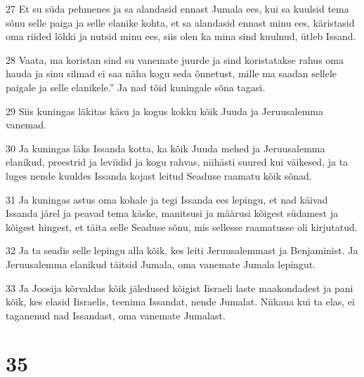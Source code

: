 \par 27 Et su süda pehmenes ja sa alandasid ennast Jumala ees, kui sa kuulsid tema sõnu selle paiga ja selle elanike kohta, et sa alandasid ennast minu ees, käristasid oma riided lõhki ja nutsid minu ees, siis olen ka mina sind kuulnud, ütleb Issand.
\par 28 Vaata, ma koristan sind su vanemate juurde ja sind koristatakse rahus oma hauda ja sinu silmad ei saa näha kogu seda õnnetust, mille ma saadan sellele paigale ja selle elanikele.” Ja nad tõid kuningale sõna tagasi.
\par 29 Siis kuningas läkitas käsu ja kogus kokku kõik Juuda ja Jeruusalemma vanemad.
\par 30 Ja kuningas läks Issanda kotta, ka kõik Juuda mehed ja Jeruusalemma elanikud, preestrid ja leviidid ja kogu rahvas, niihästi suured kui väikesed, ja ta luges nende kuuldes Issanda kojast leitud Seaduse raamatu kõik sõnad.
\par 31 Ja kuningas astus oma kohale ja tegi Issanda ees lepingu, et nad käivad Issanda järel ja peavad tema käske, manitsusi ja määrusi kõigest südamest ja kõigest hingest, et täita selle Seaduse sõnu, mis sellesse raamatusse oli kirjutatud.
\par 32 Ja ta seadis selle lepingu alla kõik, kes leiti Jeruusalemmast ja Benjaminist. Ja Jeruusalemma elanikud täitsid Jumala, oma vanemate Jumala lepingut.
\par 33 Ja Joosija kõrvaldas kõik jäledused kõigist Iisraeli laste maakondadest ja pani kõik, kes elasid Iisraelis, teenima Issandat, nende Jumalat. Niikaua kui ta elas, ei taganenud nad Issandast, oma vanemate Jumalast.

\chapter{35}

